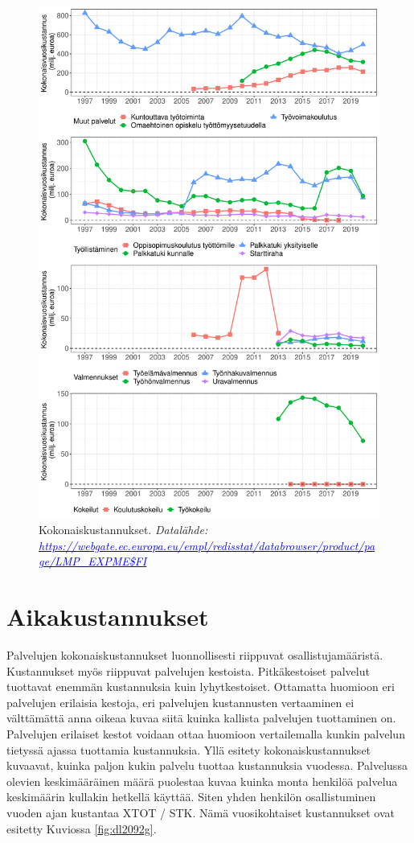 \documentclass[12pt]{article}
\newcommand{\captionselite}[1] {\textit{\footnotesize{#1}}}
\newcommand{\komissiodatalahde} {Datalähde: \href{https://webgate.ec.europa.eu/empl/redisstat/databrowser/product/page/LMP_EXPME$FI}{\textcolor{blue}{https://webgate.ec.europa.eu/empl/redisstat/databrowser/product/page/LMP\_EXPME\$FI}}}
\begin{document}
\begin{figure}
\centering
\includegraphics[scale = 0.6]{../plots/costs/total_costs.pdf}
\caption{Kokonaiskustannukset. \newline \captionselite{\komissiodatalahde}}
   \label{fig:sk230923t}
\end{figure}

\section{Aikakustannukset}

Palvelujen kokonaiskustannukset luonnollisesti riippuvat osallistujamääristä. Kustannukset myös riippuvat palvelujen kestoista. Pitkäkestoiset palvelut tuottavat enemmän kustannuksia kuin lyhytkestoiset. Ottamatta huomioon eri palvelujen erilaisia kestoja, eri palvelujen kustannusten vertaaminen ei välttämättä anna oikeaa kuvaa siitä kuinka kallista palvelujen tuottaminen on. Palvelujen erilaiset kestot voidaan ottaa huomioon vertailemalla kunkin palvelun tietyssä ajassa tuottamia kustannuksia. Yllä esitety kokonaiskustannukset kuvaavat, kuinka paljon kukin palvelu tuottaa kustannuksia vuodessa. Palvelussa olevien keskimääräinen määrä puolestaa kuvaa kuinka monta henkilöä palvelua keskimäärin kullakin hetkellä käyttää. Siten yhden henkilön osallistuminen vuoden ajan kustantaa XTOT / STK. Nämä vuosikohtaiset kustannukset ovat esitetty Kuviossa \ref{fig:dl2092g}.
\end{document}
